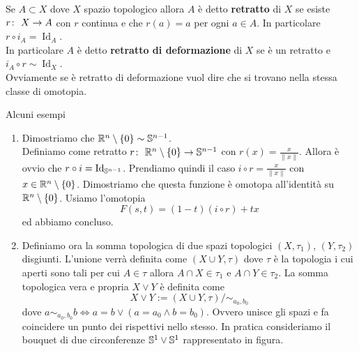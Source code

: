 \begin{definition}
	Se $A \subset X$ dove $X$ spazio topologico allora $A$ è detto \textbf{retratto} di $X$ se esiste $\morphism{r}{X}{A}$ con $r$ continua e che $r(a) = a$ per ogni $a \in A$. In particolare $r \circ i_A = \operatorname{Id}_{A}$. \\ 
	In particolare	$A$ è detto \textbf{retratto di deformazione} di $X$ se è un retratto e $i_A \circ r \sim \operatorname{Id}_{X}$.\\ Ovviamente se è retratto di deformazione vuol dire che si trovano nella stessa classe di omotopia.
\end{definition}


\begin{remark}
	Alcuni esempi
	\begin{enumerate}
		\item Dimostriamo che $\R^n \setminus \{0\} \sim \S^{n-1}$. \\ Definiamo come retratto $\morphism{r}{\R^n \setminus \{0\}}{\S^{n-1}}$ con $r(x) = \frac{x}{\|x\|}$. Allora è ovvio che $r \circ i = \operatorname{Id}_{\S^{n-1}}$. Prendiamo quindi il caso $i \circ r = \frac{x}{\|x\|}$ con $x \in \R^n  \setminus \{0\}$. Dimostriamo che questa funzione è omotopa all'identità su $\R^n \setminus \{0\}$. Usiamo l'omotopia 
		\begin{equation*}
		F(s,t) = (1-t)(i \circ r) + tx
		\end{equation*} 
		ed abbiamo concluso.
		\item Definiamo ora la somma topologica di due spazi topologici $(X, \tau_1)$, $(Y, \tau_2)$ disgiunti. L'unione verrà definita come $(X \cup Y, \tau)$ dove $\tau$ è la topologia i cui aperti sono tali per cui $A \in \tau$ allora $A \cap X \in \tau_1$ e $A \cap Y \in \tau_2$. La somma topologica vera e propria $X \lor Y$ è definita come 
		\begin{equation*}
		X \lor Y := (X \cup Y, \tau) / \sim_{a_0, b_0}
		\end{equation*}
		dove $ a \sim_{a_0, b_0} b \iff a = b \lor (a = a_0 \land b = b_0)$. Ovvero unisce gli spazi e fa coincidere un punto dei rispettivi nello stesso. In pratica consideriamo il bouquet di due circonferenze $\S^1 \lor \S^1$ rappresentato in figura.
		

\end{enumerate}
\end{remark}
